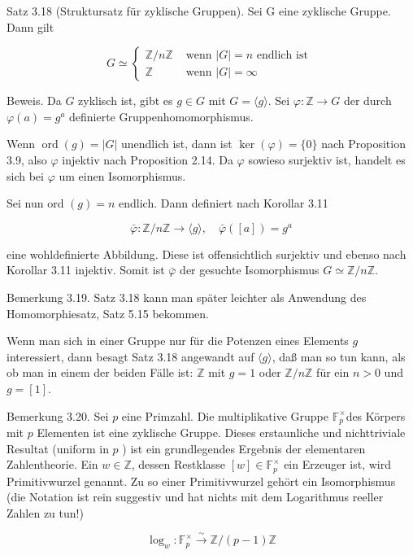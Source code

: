 \documentclass[10pt, letterpaper]{article}
\begin{document}
Satz 3.18 (Struktursatz für zyklische Gruppen). Sei G eine zyklische Gruppe. Dann gilt

$$
G \simeq \begin{cases}\mathbb{Z} / n \mathbb{Z} & \text { wenn }|G|=n \text { endlich ist } \\ \mathbb{Z} & \text { wenn }|G|=\infty\end{cases}
$$

Beweis. Da $G$ zyklisch ist, gibt es $g \in G$ mit $G=\langle g\rangle$. Sei $\varphi: \mathbb{Z} \rightarrow G$ der durch $\varphi(a)=g^{a}$ definierte Gruppenhomomorphismus.

Wenn $\operatorname{ord}(g)=|G|$ unendlich ist, dann ist $\operatorname{ker}(\varphi)=\{0\}$ nach Proposition 3.9, also $\varphi$ injektiv nach Proposition 2.14. Da $\varphi$ sowieso surjektiv ist, handelt es sich bei $\varphi$ um einen Isomorphismus.

Sei nun ord $(g)=n$ endlich. Dann definiert nach Korollar 3.11

$$
\bar{\varphi}: \mathbb{Z} / n \mathbb{Z} \rightarrow\langle g\rangle, \quad \bar{\varphi}([a])=g^{a}
$$

eine wohldefinierte Abbildung. Diese ist offensichtlich surjektiv und ebenso nach Korollar 3.11 injektiv. Somit ist $\bar{\varphi}$ der gesuchte Isomorphismus $G \simeq \mathbb{Z} / n \mathbb{Z}$.

Bemerkung 3.19. Satz 3.18 kann man später leichter als Anwendung des Homomorphiesatz, Satz 5.15 bekommen.

Wenn man sich in einer Gruppe nur für die Potenzen eines Elements $g$ interessiert, dann besagt Satz 3.18 angewandt auf $\langle g\rangle$, daß man so tun kann, als ob man in einem der beiden Fälle ist: $\mathbb{Z}$ mit $g=1$ oder $\mathbb{Z} / n \mathbb{Z}$ für ein $n>0$ und $g=[1]$.

Bemerkung 3.20. Sei $p$ eine Primzahl. Die multiplikative Gruppe $\mathbb{F}_{p}^{\times}$des Körpers mit $p$ Elementen ist eine zyklische Gruppe. Dieses erstaunliche und nichttriviale Resultat (uniform in $p$ ) ist ein grundlegendes Ergebnis der elementaren Zahlentheorie. Ein $w \in \mathbb{Z}$, dessen Restklasse $[w] \in \mathbb{F}_{p}^{\times}$ ein Erzeuger ist, wird Primitivwurzel genannt. Zu so einer Primitivwurzel gehört ein Isomorphismus (die Notation ist rein suggestiv und hat nichts mit dem Logarithmus reeller Zahlen zu tun!)

$$
\log _{w}: \mathbb{F}_{p}^{\times} \xrightarrow{\sim} \mathbb{Z} /(p-1) \mathbb{Z}
$$
\end{document}
